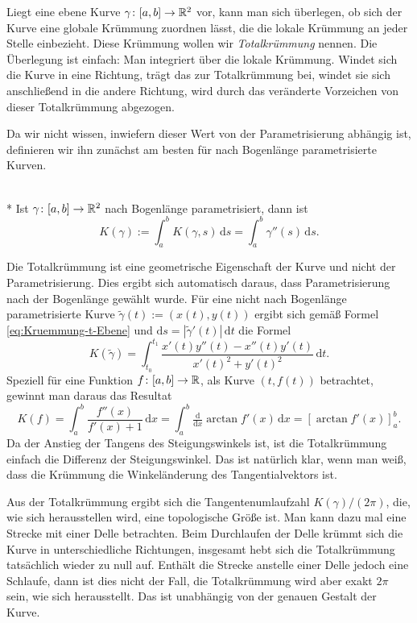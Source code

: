 Liegt eine ebene Kurve $\gamma\colon[a,b]\to\mathbb R^2$ vor, kann man sich
überlegen, ob sich der Kurve eine globale Krümmung zuordnen lässt,
die die lokale Krümmung an jeder Stelle einbezieht. Diese Krümmung
wollen wir \emph{Totalkrümmung} nennen. Die Überlegung
ist einfach: Man integriert über die lokale Krümmung. Windet sich
die Kurve in eine Richtung, trägt das zur Totalkrümmung bei, windet sie
sich anschließend in die andere Richtung, wird durch das veränderte
Vorzeichen von dieser Totalkrümmung abgezogen.

Da wir nicht wissen, inwiefern dieser Wert von der Parametrisierung
abhängig ist, definieren wir ihn zunächst am besten für nach Bogenlänge
parametrisierte Kurven.

\begin{definition}[Totalkrümmung]\mbox{}\\*
Ist $\gamma\colon [a,b]\to\mathbb R^2$ nach Bogenlänge parametrisiert, dann ist
\begin{equation}
K(\gamma) := \int_a^b K(\gamma,s)\,\mathrm ds
= \int_a^b \gamma''(s)\,\mathrm ds.
\end{equation}
\end{definition}
Die Totalkrümmung ist eine geometrische Eigenschaft der Kurve
und nicht der Parametrisierung. Dies ergibt sich automatisch
daraus, dass Parametrisierung nach der Bogenlänge gewählt wurde.
Für eine nicht nach Bogenlänge parametrisierte Kurve
$\tilde \gamma(t) := (x(t),y(t))$ ergibt sich gemäß Formel
\eqref{eq:Kruemmung-t-Ebene} und
$\mathrm ds = |\tilde \gamma'(t)|\,\mathrm dt$
die Formel
\begin{equation}
K(\tilde\gamma) = \int_{t_0}^{t_1}
\frac{x'(t)y''(t)-x''(t)y'(t)}{x'(t)^2+y'(t)^2}\,\mathrm dt.
\end{equation}
Speziell für eine Funktion $f\colon [a,b]\to\mathbb R$, als Kurve
$(t,f(t))$ betrachtet, gewinnt man daraus das Resultat
\begin{equation}
K(f) = \int_a^b \frac{f''(x)}{f'(x)+1}\,\mathrm dx
= \int_a^b \tfrac{\mathrm d}{\mathrm dx}\arctan f'(x)\,\mathrm dx
= [\arctan f'(x)]_a^b.
\end{equation}
Da der Anstieg der Tangens des Steigungswinkels ist, ist die
Totalkrümmung einfach die Differenz der Steigungswinkel.
Das ist natürlich klar, wenn man weiß, dass die Krümmung
die Winkeländerung des Tangentialvektors ist.

Aus der Totalkrümmung ergibt sich die Tangentenumlaufzahl
$K(\gamma)/(2\pi)$, die, wie sich herausstellen wird, eine topologische
Größe ist. Man kann dazu mal eine Strecke mit einer Delle
betrachten. Beim Durchlaufen der Delle krümmt sich die Kurve
in unterschiedliche Richtungen, insgesamt hebt sich die Totalkrümmung
tatsächlich wieder zu null auf. Enthält die Strecke anstelle
einer Delle jedoch eine Schlaufe, dann ist dies nicht der
Fall, die Totalkrümmung wird aber exakt $2\pi$ sein, wie sich
herausstellt. Das ist unabhängig von der genauen Gestalt der Kurve.

